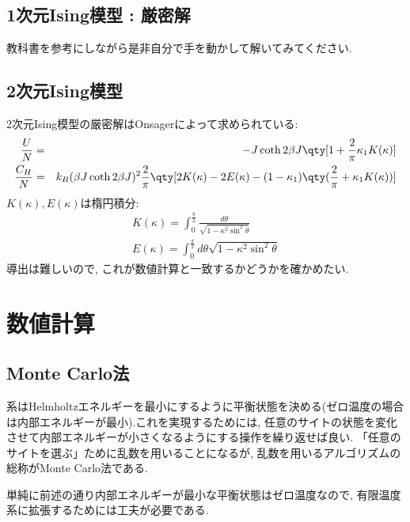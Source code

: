 \documentclass[10.5pt,a4paper]{jreport}
\begin{document}
\subsection{1次元Ising模型 : 厳密解}
教科書を参考にしながら是非自分で手を動かして解いてみてください.
\subsection{2次元Ising模型}
2次元Ising模型の厳密解はOnsagerによって求められている:
\begin{eqnarray}
  \frac{U}{N} &=& -J\coth{2\beta J}\qty[1+\frac{2}{\pi}\kappa_1 K(\kappa)]\\
  \frac{C_H}{N} &=& k_B(\beta J\coth{2\beta J})^2\frac{2}{\pi}\qty[2K(\kappa)-2E(\kappa) - (1-\kappa_1)\qty(\frac{2}{\pi} + \kappa_1K(\kappa))]
\end{eqnarray}
$K(\kappa), E(\kappa)$は楕円積分:
\begin{eqnarray}
  K(\kappa) = \int_0^{\frac{\pi}{2}}\frac{d\theta}{\sqrt{1-\kappa^2\sin^2{\theta}}}\\
  E(\kappa) = \int_0^{\frac{\pi}{2}}d\theta \sqrt{1-\kappa^2\sin^2{\theta}}
\end{eqnarray}
導出は難しいので, これが数値計算と一致するかどうかを確かめたい. 

\section{数値計算}
\subsection{Monte Carlo法}
系はHelmholtzエネルギーを最小にするように平衡状態を決める(ゼロ温度の場合は内部エネルギーが最小).これを実現するためには, 任意のサイトの状態を変化させて内部エネルギーが小さくなるようにする操作を繰り返せば良い. 「任意のサイトを選ぶ」ために乱数を用いることになるが, 乱数を用いるアルゴリズムの総称がMonte Carlo法である.

単純に前述の通り内部エネルギーが最小な平衡状態はゼロ温度なので, 有限温度系に拡張するためには工夫が必要である. 
\end{document}
